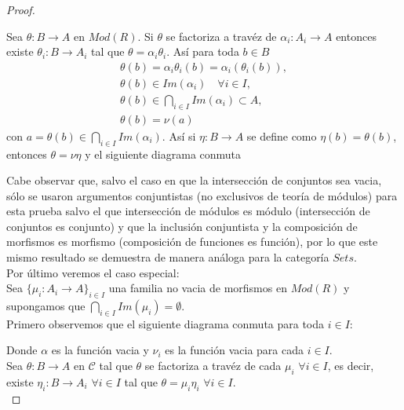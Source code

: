 \documentclass{article}
\begin{document}
\begin{enumerate}[label=\textbf{Ej \arabic*.}]
\begin{proof}
\centerline{}

Sea $\theta\colon B\longrightarrow A$ en $Mod(R)$. Si $\theta$ se factoriza a travéz de $\alpha_i\colon A_i\longrightarrow A$ entonces existe
$\theta_i\colon B\longrightarrow A_i$ tal que $\theta=\alpha_i\theta_i$. Así para toda $b\in B$
\begin{align*}
\theta(b)=\alpha_i\theta_i(b)=\alpha_i(\theta_i(b)),\\
\theta(b)\in Im(\alpha_i)\quad \forall i\in I,\\
\theta(b)\in \displaystyle\bigcap_{i\in I}Im(\alpha_i)\subset A,\\
\theta(b)=\nu(a)
\end{align*}
con $a=\theta(b)\in \displaystyle\bigcap_{i\in I}Im(\alpha_i)$. Así si $\eta\colon B\longrightarrow A$  se define como $\eta(b)=\theta(b)$, entonces 
$\theta=\nu\eta$ y el siguiente diagrama conmuta

\centerline{}

Cabe observar que, salvo el caso en que la intersección de conjuntos sea vacia, sólo se usaron argumentos conjuntistas 
(no exclusivos de teoría de módulos) para esta prueba salvo el que intersección de módulos es módulo
 (intersección de conjuntos es conjunto) y que la inclusión conjuntista y la composición de morfismos es morfismo (composición de funciones es función),
por lo que este mismo resultado se demuestra de manera análoga para la categoría $Sets$.\\

Por último veremos el caso especial:\\

Sea $\{\mu_i\colon A_i\longrightarrow A\}_{i\in I}$ una familia no vacia de morfismos en $Mod(R)$ y supongamos que 
$\displaystyle\bigcap_{i\in I}Im(\mu_i)=\emptyset$.\\
Primero observemos que el siguiente diagrama conmuta para toda $i\in I$:

\centerline{}

Donde $\alpha$ es la función vacia y $\nu_i$ es la función vacia para cada $i\in I$.\\

Sea  $\theta\colon B\longrightarrow A$ en $\mathscr{C}$ tal que $\theta$ se factoriza a travéz de cada $\mu_i\,\,\forall i\in I$, es decir, existe
$\eta_i\colon B\longrightarrow A_i\,\,\forall i\in I$ tal que $\theta=\mu_i\eta_i\,\,\forall i\in I$.\\


\end{proof}
\end{enumerate}
\end{document}
